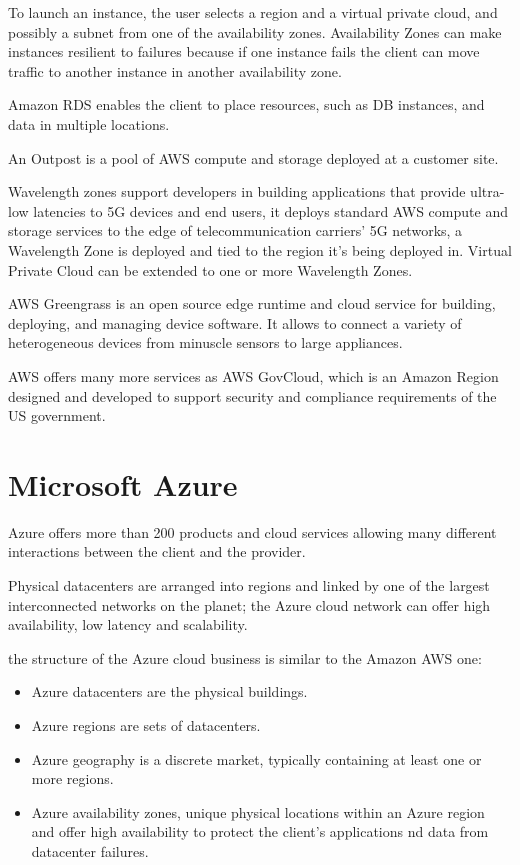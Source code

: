 To launch an instance, the user selects a region and a virtual private cloud, and possibly a subnet from one of the availability zones. Availability Zones can make instances resilient to failures because if one instance fails the client can move traffic to another instance in another availability zone.

Amazon RDS enables the client to place resources, such as DB instances, and data in multiple locations.

An Outpost is a pool of AWS compute and storage deployed at a customer site.

Wavelength zones support developers in building applications that provide ultra-low latencies to 5G
devices and end users, it deploys standard AWS compute and storage services to the edge of
telecommunication carriers' 5G networks, a Wavelength Zone is deployed and tied to the region it's
being deployed in. Virtual Private Cloud can be extended to one or more Wavelength Zones.

AWS Greengrass is an open source edge runtime and cloud service for building, deploying, and managing device software. It allows to connect a variety of heterogeneous devices from minuscle sensors to large appliances.

AWS offers many more services as AWS GovCloud, which is an Amazon Region designed and developed to support security and compliance requirements of the US government.

\section{Microsoft Azure}
Azure offers more than 200 products and cloud services allowing many different interactions between the client and the provider.

Physical datacenters are arranged into regions and linked by one of the largest interconnected networks on the planet; the Azure cloud network can offer high availability, low latency and scalability.

the structure of the Azure cloud business is similar to the Amazon AWS one:
\begin{itemize}
    \item Azure datacenters are the physical buildings.
    \item Azure regions are sets of datacenters.
    \item Azure geography is a discrete market, typically containing at least one or more regions.
    \item Azure availability zones, unique physical locations within an Azure region and offer high availability to protect the client's applications nd data from datacenter failures.
\end{itemize}


